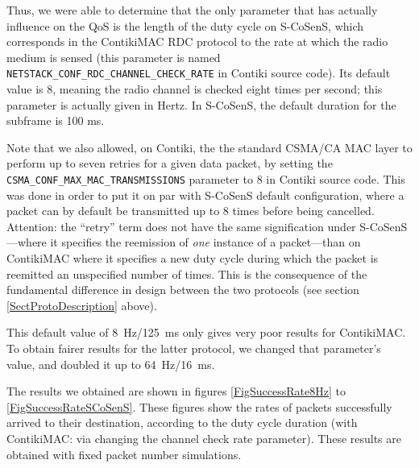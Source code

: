 \documentclass[a4paper,twoside]{article}
\begin{document}
Thus, we were able to determine that the only parameter that has actually
influence on the QoS is the length of the duty cycle on S-CoSenS, which
corresponds in the ContikiMAC RDC protocol to the rate at which the radio
medium is sensed (this parameter is named
\texttt{NETSTACK\_CONF\_RDC\_CHANNEL\_CHECK\_RATE} in Contiki source code).
Its default value is 8, meaning the radio channel is checked eight times
per second; this parameter is actually given in Hertz.
In S-CoSenS, the default duration for the subframe is 100 ms.

Note that we also allowed, on Contiki, the the standard CSMA/CA MAC layer
to perform up to seven retries for a given data packet, by setting the
\texttt{CSMA\_CONF\_MAX\_MAC\_TRANSMISSIONS}
parameter to 8 in Contiki source code. This was done in order to put it
on par with S-CoSenS default configuration, where a packet can by default
be transmitted up to 8 times before being cancelled.
Attention: the ``retry'' term does not have the same signification
under S-CoSenS---where it specifies the reemission of \emph{one} instance of
a packet---than on ContikiMAC where it specifies a new duty cycle during
which the packet is reemitted an unspecified number of times. This is
the consequence of the fundamental difference in design between the two
protocols (see section \ref{SectProtoDescription} above).

This default value of 8~Hz/125~ms only gives very poor results for ContikiMAC.
To obtain fairer results for the latter protocol, we changed that parameter's
value, and doubled it up to 64~Hz/16~ms.

The results we obtained are shown in figures \ref{FigSuccessRate8Hz} to
\ref{FigSuccessRateSCoSenS}. These figures show the rates of packets
successfully arrived to their destination, according to the duty cycle
duration (with ContikiMAC: via changing the channel check rate parameter).
These results are obtained with fixed packet number simulations.
\end{document}
